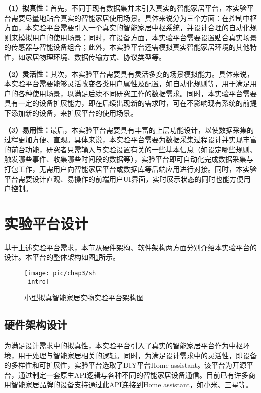 \textbf{（1）拟真性：}首先，不同于现有数据集并未引入真实的智能家居平台，本实验平台需要尽量地贴合真实的智能家居使用场景。具体来说分为三个方面：在控制中枢方面，本实验平台需要引入一个真实的智能家居中枢系统，并设计合理的自动化规则来模拟用户的使用场景；同时，在设备方面，本实验平台需要设置贴合真实场景的传感器与智能设备组合；此外，本实验平台还需模拟真实智能家居环境的其他特性，如家居物理环境、数据传输方式、协议类型等。

\textbf{（2）灵活性：}其次，本实验平台需要具有灵活多变的场景模拟能力。具体来说，本实验平台需要能够灵活改变各类用户属性及配置，如自动化规则等，用于满足用户的各种使用场景，以满足后续不同研究工作的数据需求。同时，本实验平台需要具有一定的设备扩展能力，即在后续出现新的需求时，可在不影响现有系统的前提下添加新的设备，来扩展平台的使用场景。

\textbf{（3）易用性：}最后，本实验平台需要具有丰富的上层功能设计，以使数据采集的过程更加方便、直观。具体来说，本实验平台需要为数据采集过程设计并实现丰富的前台功能，研究者只需输入与实验设置有关的一些基本信息（如设定哪些规则、触发哪些事件、收集哪些时间段的数据等），实验平台即可自动化完成数据采集与打包工作，无需用户向智能家居平台或数据库等后端应用进行对接。同时，本实验平台需要设计直观、易操作的前端用户UI界面，实时展示状态的同时也能方便用户控制。

\section{实验平台设计}

基于上述实验平台需求，本节从硬件架构、软件架构两方面分别介绍本实验平台的设计。本平台的整体架构如图\ref{fig:sh_intro}所示。

\begin{figure}[!h]
	\centering
	\texttt{[image: pic/chap3/sh\\\_intro]}
	\caption{小型拟真智能家居实物实验平台架构图}
	\label{fig:sh_intro}
\end{figure}

\subsection{硬件架构设计}

为满足设计需求中的拟真性，本实验平台引入了真实的智能家居平台作为中枢环境，用于处理与智能家居相关的逻辑。同时，为满足设计需求中的灵活性，即设备的多样性和可扩展性，实验平台选取了DIY平台Home assistant。该平台为开源平台，通过制定一套原生API逻辑与各种不同的智能家居设备通信。目前已有许多商用智能家居品牌的设备支持通过此API连接到Home assistant，如小米、三星等。

